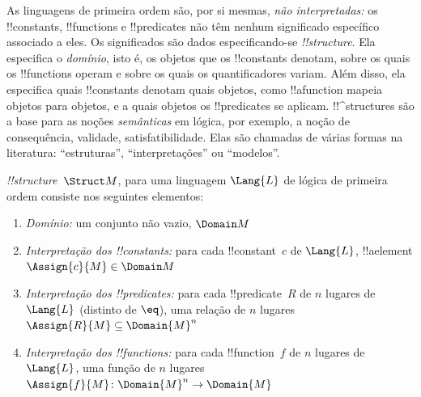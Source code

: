 \documentclass[../../../include/open-logic-section]{subfiles}
\begin{document}


\begin{explain}
As linguagens de primeira ordem são, por si mesmas, \emph{não interpretadas:} os
!!{constant}s, !!{function}s e !!{predicate}s não têm nenhum significado
específico associado a eles. Os significados são dados especificando-se
 \emph{!!{structure}}. Ela especifica o
\emph{domínio}, isto é, os objetos que os !!{constant}s denotam, sobre os quais os
!!{function}s operam e sobre os quais os quantificadores variam. Além disso,
ela especifica quais !!{constant}s denotam quais objetos, como
!!a{function} mapeia objetos para objetos, e a quais objetos os
!!{predicate}s se aplicam. !!^{structure}s são a base para as
noções \emph{semânticas} em lógica, por exemplo, a noção de consequência,
validade, satisfatibilidade. Elas são chamadas de várias formas na
literatura: ``estruturas'', ``interpretações'' ou ``modelos''.
\end{explain}

\begin{defn}[!!^{structure}s]
 \emph{!!{structure}}~$\Struct M$, para uma linguagem
$\Lang{L}$ de lógica de primeira ordem consiste nos seguintes elementos:
\begin{enumerate}
\item \emph{Domínio:} um conjunto não vazio, $\Domain M$
\item \emph{Interpretação dos !!{constant}s:} para cada !!{constant}~$c$ de
  $\Lang{L}$, !!a{element} $\Assign{c}{M} \in \Domain M$
\item \emph{Interpretação dos !!{predicate}s:} para cada
  !!{predicate}~$R$ de $n$ lugares de $\Lang{L}$ (distinto de $\eq$), uma relação
  de $n$ lugares $\Assign{R}{M} \subseteq \Domain{M}^n$
\item \emph{Interpretação dos !!{function}s:} para cada
  !!{function}~$f$ de $n$ lugares de $\Lang{L}$, uma função de $n$ lugares $\Assign{f}{M}
  \colon \Domain{M}^n \to \Domain{M}$
\end{enumerate}
\end{defn}
\end{document}
